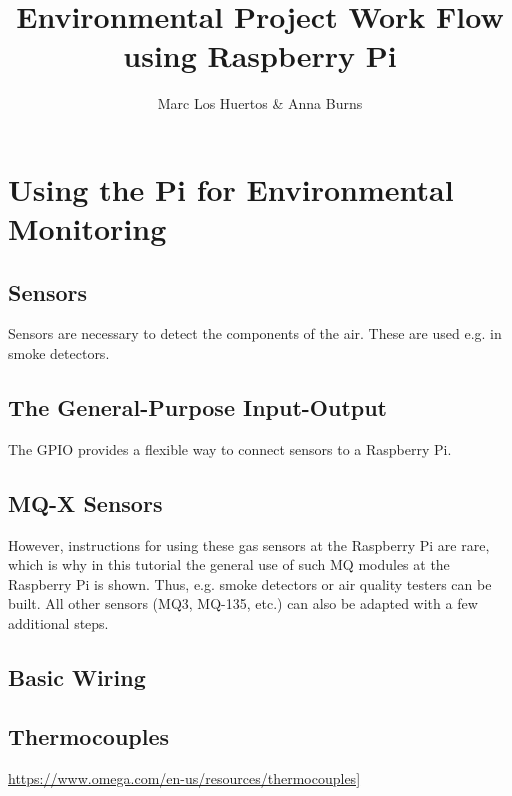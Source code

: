 \documentclass{article}\usepackage[]{graphicx}\usepackage[]{color}
\title{Environmental Project Work Flow using Raspberry Pi}
\author{Marc Los Huertos \& Anna Burns}
\begin{document}
\maketitle

\section{Using the Pi for Environmental Monitoring}

\subsection{Sensors}

Sensors are necessary to detect the components of the air. These are used e.g. in smoke detectors. 

\subsection{The General-Purpose Input-Output}

The GPIO provides a flexible way to connect sensors to a Raspberry Pi. 

\subsection{MQ-X Sensors}

However, instructions for using these gas sensors at the Raspberry Pi are rare, which is why in this tutorial the general use of such MQ modules at the Raspberry Pi is shown. Thus, e.g. smoke detectors or air quality testers can be built. All other sensors (MQ3, MQ-135, etc.) can also be adapted with a few additional steps.

\subsection{Basic Wiring}




\subsection{Thermocouples}

\href{Thermocouples Sensors}{https://www.omega.com/en-us/resources/thermocouples]}
\end{document}
